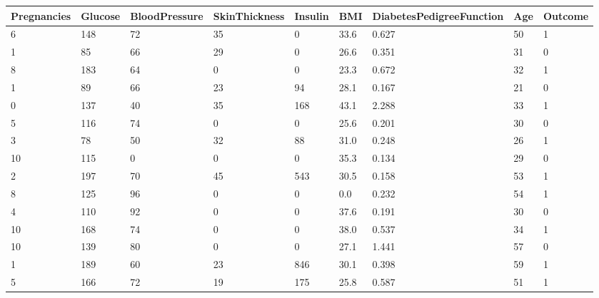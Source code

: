 \documentclass[12pt]{article}
\begin{document}
{
\clearpage
\begin{landscape}
\centering
\begin{table}[]
\centering
\vspace{1.5cm}
\begin{tabular}{|l|l|l|l|l|l|l|l|l|}
\hline
 Pregnancies &  Glucose &  BloodPressure &  SkinThickness &  Insulin &   BMI &  DiabetesPedigreeFunction &  Age &  Outcome \\\hline
           6 &      148 &             72 &             35 &        0 &  33.6 &                     0.627 &   50 &        1 \\\hline
           1 &       85 &             66 &             29 &        0 &  26.6 &                     0.351 &   31 &        0 \\\hline
           8 &      183 &             64 &              0 &        0 &  23.3 &                     0.672 &   32 &        1 \\\hline
           1 &       89 &             66 &             23 &       94 &  28.1 &                     0.167 &   21 &        0 \\\hline
           0 &      137 &             40 &             35 &      168 &  43.1 &                     2.288 &   33 &        1 \\\hline
           5 &      116 &             74 &              0 &        0 &  25.6 &                     0.201 &   30 &        0 \\\hline
           3 &       78 &             50 &             32 &       88 &  31.0 &                     0.248 &   26 &        1 \\\hline
          10 &      115 &              0 &              0 &        0 &  35.3 &                     0.134 &   29 &        0 \\\hline
           2 &      197 &             70 &             45 &      543 &  30.5 &                     0.158 &   53 &        1 \\\hline
           8 &      125 &             96 &              0 &        0 &   0.0 &                     0.232 &   54 &        1 \\\hline
           4 &      110 &             92 &              0 &        0 &  37.6 &                     0.191 &   30 &        0 \\\hline
          10 &      168 &             74 &              0 &        0 &  38.0 &                     0.537 &   34 &        1 \\\hline
          10 &      139 &             80 &              0 &        0 &  27.1 &                     1.441 &   57 &        0 \\\hline
           1 &      189 &             60 &             23 &      846 &  30.1 &                     0.398 &   59 &        1 \\\hline
           5 &      166 &             72 &             19 &      175 &  25.8 &                     0.587 &   51 &        1 \\\hline
\end{tabular}
\end{table}
\label{table:5}
\end{landscape}
\clearpage
}
\end{document}
